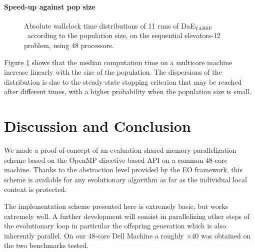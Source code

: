 \documentclass{sig-alternate}
\newcommand{\DAEYAHSP}{{\sc DaE$_{\text{YAHSP}}$}}
\begin{document}
\paragraph{Speed-up against pop size} %

\begin{figure}[htpb]
  \begin{center}
    \hfill
  \end{center}
  \caption{Absolute wallclock time distributions of 11 runs of \DAEYAHSP\ according to the population size, on the sequential elevators-12 problem, using 48 processors.}
  \label{fig:elevators_pop}
\end{figure}

Figure \ref{fig:elevators_pop} shows that the median computation time on a
multicore machine increase linearly with the size of the population. The 
dispersions of the distribution is due to the steady-state stopping criterion 
that may be reached after different times, with a higher probability when the
population size is small.

\section{Discussion and Conclusion}

We made a proof-of-concept of an evaluation shared-memory parallelization scheme based on the OpenMP directive-based API on a common 48-core machine.
Thanks to the abstraction level provided by the EO framework, this scheme is available for any evolutionary algorithm as far as the individual local context is protected.

The implementation scheme presented here is extremely basic, but works extremely well.
A further development will consist in parallelizing other steps of the evolutionary loop in particular the offspring generation which is also inherently parallel.
On our 48-core Dell Machine a roughly $\times40$ was obtained on the two benchmarks tested.
\end{document}
